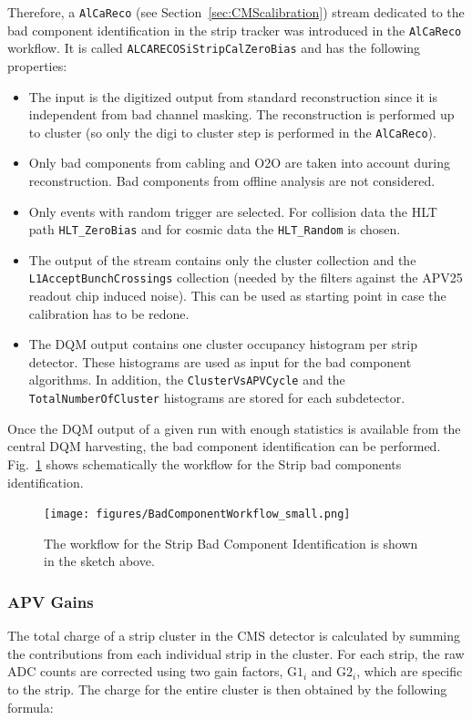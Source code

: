 Therefore, a \texttt{AlCaReco} (see Section~\ref{sec:CMScalibration}) stream dedicated to the bad component identification in the strip tracker was introduced in the \texttt{AlCaReco} workflow. It is called \texttt{ALCARECOSiStripCalZeroBias} and has the following properties:
\begin{itemize}
\item  The input is the digitized output from standard reconstruction since it is independent from bad channel masking. The reconstruction is performed up to cluster (so only the digi to cluster step is performed in the \texttt{AlCaReco}).
\item Only bad components from cabling and O2O are taken into account during reconstruction. Bad components from offline analysis are not considered.
\item Only events with random trigger are selected. For collision data the HLT path \texttt{HLT\_ZeroBias} and for cosmic data the \texttt{HLT\_Random} is chosen.
\item The output of the stream contains only the cluster collection and the \texttt{L1AcceptBunchCrossings} collection (needed by the filters against the APV25 readout chip \cite{French:2001xb} induced noise). This can be used as starting point in case the calibration has to be redone.
\item The DQM output contains one cluster occupancy histogram per strip detector. These histograms are used as input for the bad component algorithms. In addition, the \texttt{ClusterVsAPVCycle} and the \texttt{TotalNumberOfCluster} histograms are stored for each subdetector. 
\end{itemize}

Once the DQM output of a given run with enough statistics is available from the central DQM harvesting, the bad component identification can be performed.\\ Fig.~\ref{fig:fill10200PCL_0} shows schematically the workflow for the Strip bad components identification.

\begin{figure}[htbp]
   \centering
	\texttt{[image: figures/BadComponentWorkflow\_small.png]}
   \caption{The workflow for the Strip Bad Component Identification is shown in the sketch above.}
   \label{fig:fill10200PCL_0}
\end{figure}

\subsubsection{APV Gains}
The total charge of a strip cluster in the CMS detector is calculated by summing the contributions from each individual strip in the cluster. For each strip, the raw ADC counts are corrected using two gain factors, \(\text{G1}_i\) and \(\text{G2}_i\), which are specific to the strip. The charge for the entire cluster is then obtained by the following formula:

